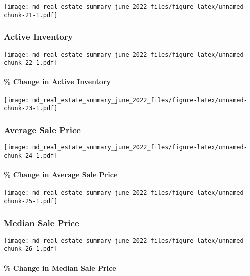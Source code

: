 \documentclass[
]{article}
\begin{document}
\texttt{[image: md\_real\_estate\_summary\_june\_2022\_files/figure-latex/unnamed-chunk-21-1.pdf]}

\hypertarget{active-inventory-1}{%
\subsubsection{Active Inventory}\label{active-inventory-1}}

\texttt{[image: md\_real\_estate\_summary\_june\_2022\_files/figure-latex/unnamed-chunk-22-1.pdf]}

\hypertarget{change-in-active-inventory-1}{%
\paragraph{\% Change in Active
Inventory}\label{change-in-active-inventory-1}}

\texttt{[image: md\_real\_estate\_summary\_june\_2022\_files/figure-latex/unnamed-chunk-23-1.pdf]}

\hypertarget{average-sale-price-1}{%
\subsubsection{Average Sale Price}\label{average-sale-price-1}}

\texttt{[image: md\_real\_estate\_summary\_june\_2022\_files/figure-latex/unnamed-chunk-24-1.pdf]}

\hypertarget{change-in-average-sale-price-1}{%
\paragraph{\% Change in Average Sale
Price}\label{change-in-average-sale-price-1}}

\texttt{[image: md\_real\_estate\_summary\_june\_2022\_files/figure-latex/unnamed-chunk-25-1.pdf]}

\hypertarget{median-sale-price-1}{%
\subsubsection{Median Sale Price}\label{median-sale-price-1}}

\texttt{[image: md\_real\_estate\_summary\_june\_2022\_files/figure-latex/unnamed-chunk-26-1.pdf]}

\hypertarget{change-in-median-sale-price-1}{%
\paragraph{\% Change in Median Sale
Price}\label{change-in-median-sale-price-1}}
\end{document}
